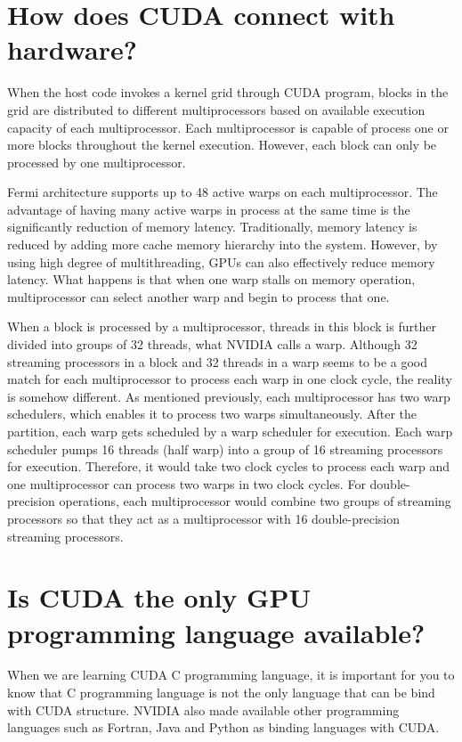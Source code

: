 \documentclass[letterpaper,10pt,english]{sphinxmanual}
\begin{document}
\section{How does CUDA connect with hardware?}
\label{Introduction/Introduction:how-does-cuda-connect-with-hardware}\label{Introduction/Introduction:radeon}
When the host code invokes a kernel grid through CUDA program, blocks in the grid are distributed to different multiprocessors based on available execution capacity of each multiprocessor. Each multiprocessor is capable of process one or more blocks throughout the kernel execution. However, each block can only be processed by one multiprocessor.

Fermi architecture supports up to 48 active warps on each multiprocessor. The advantage of having many active warps in process at the same time is the significantly reduction of memory latency. Traditionally, memory latency is reduced by adding more cache memory hierarchy into the system. However, by using high degree of multithreading, GPUs can also effectively reduce memory latency. What happens is that when one warp stalls on memory operation, multiprocessor can select another warp and begin to process that one.

When a block is processed by a multiprocessor, threads in this block is further divided into groups of 32 threads, what NVIDIA calls a warp. Although 32 streaming processors in a block and 32 threads in a warp seems to be a good match for each multiprocessor to process each warp in one clock cycle, the reality is somehow different. As mentioned previously, each multiprocessor has two warp schedulers, which enables it to process two warps simultaneously. After the partition, each warp gets scheduled by a warp scheduler for execution. Each warp scheduler pumps 16 threads (half warp) into a group of 16 streaming processors for execution. Therefore, it would take two clock cycles to process each warp and one multiprocessor can process two warps in two clock cycles. For double-precision operations, each multiprocessor would combine two groups of streaming processors so that they act as a multiprocessor with 16 double-precision streaming processors.


\section{Is CUDA the only GPU programming language available?}
\label{Introduction/Introduction:is-cuda-the-only-gpu-programming-language-available}
When we are learning CUDA C programming language, it is important for you to know that C programming language is not the only language that can be bind with CUDA structure. NVIDIA also made available other programming languages such as Fortran, Java and Python as binding languages with CUDA.
\end{document}
